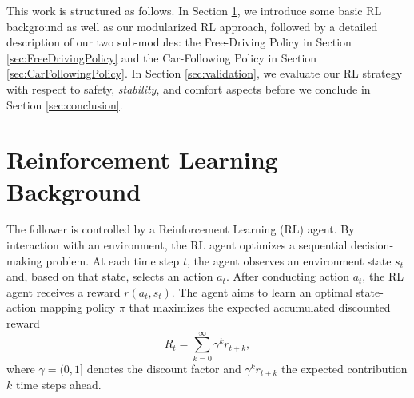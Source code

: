 \documentclass[review]{elsarticle}
\providecommand{\3}{{\ss}}
\begin{document}
	This work is structured as follows. In Section \ref{sec:RLBackground},
	we introduce some basic RL background as well as our modularized RL
	approach, followed by a detailed description of our two sub-modules:
	the Free-Driving Policy in Section \ref{sec:FreeDrivingPolicy} and the
	Car-Following Policy in Section
	\ref{sec:CarFollowingPolicy}. In Section \ref{sec:validation}, we evaluate our RL
	strategy with respect to safety, \emph{stability}, and comfort aspects
	before we conclude in Section \ref{sec:conclusion}.
	
	
	\section{Reinforcement Learning Background}
	\label{sec:RLBackground}
	
	The follower is controlled by a Reinforcement
	Learning (RL) agent. By interaction with an environment, the RL agent
	optimizes a sequential decision-making problem. At each time step
	$t$, the agent observes an environment state $s_t$ and, based on that state, selects
	an action $a_t$. After conducting action $a_t$, the RL agent receives
	a reward $r(a_t,s_t)$. The agent aims to learn an optimal state-action
	mapping policy $\pi$ that maximizes the expected accumulated
	discounted reward
	\begin{equation}
		\label{Rt}
		R_{t}=\sum_{k=0}^{\infty} \gamma^{k} r_{t+k},
	\end{equation}
	where $\gamma = (0,1]$ denotes the discount factor and 
	$\gamma^k r_{t+k}$ the expected contribution $k$ time steps ahead. 
\end{document}
